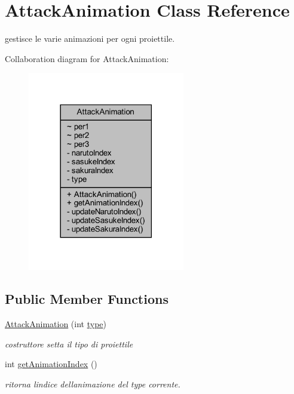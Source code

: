 \hypertarget{classtowers_1_1_attack_animation}{}\section{Attack\+Animation Class Reference}
\label{classtowers_1_1_attack_animation}


gestisce le varie animazioni per ogni proiettile.  




Collaboration diagram for Attack\+Animation\+:\nopagebreak
\begin{figure}[H]
\begin{center}
\leavevmode
\includegraphics[width=194pt]{classtowers_1_1_attack_animation__coll__graph}
\end{center}
\end{figure}
\subsection*{Public Member Functions}
\begin{DoxyCompactItemize}
\item 
\hyperlink{classtowers_1_1_attack_animation_aa2f7222a5c2212052a4024e1f88e0f90}{Attack\+Animation} (int \hyperlink{classtowers_1_1_attack_animation_ac765329451135abec74c45e1897abf26}{type})
\begin{DoxyCompactList}\small\item\em costruttore setta il tipo di proiettile \end{DoxyCompactList}\item 
int \hyperlink{classtowers_1_1_attack_animation_ae8c4fe920791c4525eb1a9ab79d1e3b7}{get\+Animation\+Index} ()
\begin{DoxyCompactList}\small\item\em ritorna l\textquotesingle{}indice dell\textquotesingle{}animazione del type corrente. \end{DoxyCompactList}\end{DoxyCompactItemize}
